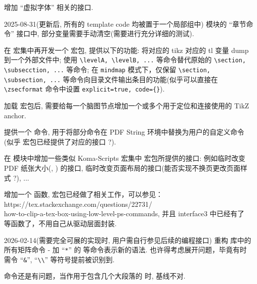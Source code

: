 \begin{todolist}
  \item 增加 ``虚拟字体'' 相关的接口.
  \item [2025-08-31(更新后, 所有的 template code 均被置于一个局部组中)]  模块的 ``章节命令'' 接口中, 部分变量需要手动清空(需要进行充分详细的测试).
  \item 在 \ztex{} 宏集中再开发一个  宏包, 提供以下的功能: 将对应的 tikz 对应的 tl 变量 dump 到一个外部文件中; 使用 \verb|\levelA, \levelB, ...| 等命令替代原始的 \verb|\section, \subsecction, ...| 等命令; 在 \texttt{mindmap} 模式下，仅保留 \verb|\section, \subsection, ...| 等命令向目录文件输出条目的功能(似乎可以直接在 \verb|\zsecformat| 命令中设置 \texttt{explicit=true, code=\{\}}).
  \item 加载  宏包后, 需要给每一个脑图节点增加一个或多个用于定位和连接使用的 TikZ anchor.
  \item 提供一个 \cmd{\zsecpdfstringcmdsub} 命令, 用于将部分命令在 PDF String 环境中替换为用户的自定义命令(似乎  宏包已经提供了对应的接口 ?).
  \item 在  模块中增加一些类似 Koma-Scripts 宏集中  宏包所提供的接口: 例如临时改变 PDF 纸张大小(\cmd{\pdfpagewidth}, \cmd{\pdfpageheight}) 的接口, 临时改变页面布局的接口(能否实现不换页更改页面样式 ?), ...
  \item 增加一个  函数,  宏包已经做了相关工作，可以参见：{\ttfamily https://tex.stackexchange.com/questions/22731/}\\ {\ttfamily how-to-clip-a-tex-box-using-low-level-ps-commands}, 并且 interface3 中已经有了  等函数了，不用自己从驱动层面封装.
  \item [2026-02-14(需要完全可展的实现时, 用户需自行参见后续的编程接口)] 重构  库中的所有矩阵命令 - 加 ``\texttt{*}'' 的 \cmd{\mat} 等命令表示新的语法. 也许得考虑展开问题，毕竟有时需令 ``\texttt{\&}'', ``\verb|\\|'' 等符号提前被识别到.
  \item \cmd{\zfbox} 命令还是有问题，当作用于包含几个大段落的 \cmd{\parbox} 时, 基线不对.

\end{todolist}
